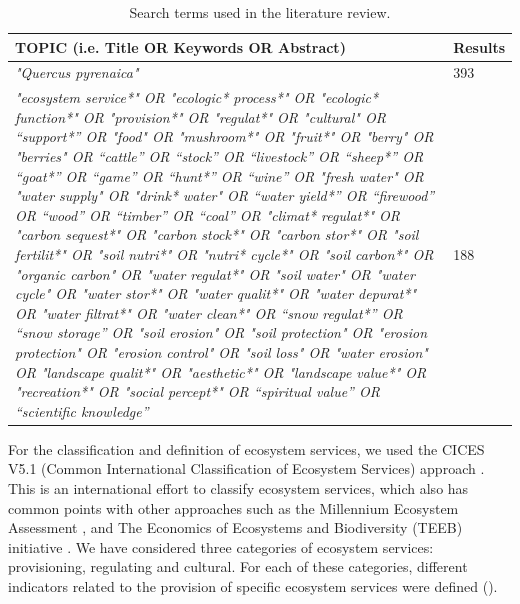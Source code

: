 \begin{table}[]
\caption{Search terms used in the literature review.}
\label{tab:es:wos}
\footnotesize
\begin{tabular}{>{\centering}p{11cm}l}
\toprule
\textbf{TOPIC (i.e. Title OR Keywords OR Abstract)} & \textbf{Results} \\ 
\toprule
\emph{"Quercus pyrenaica"} & 393 \\ \midrule
\emph{"ecosystem service*" OR "ecologic* process*" OR "ecologic*
function*" OR "provision*" OR "regulat*" OR "cultural" OR ``support*'' OR
"food" OR "mushroom*" OR "fruit*" OR "berry" OR "berries" OR
``cattle'' OR ``stock'' OR ``livestock'' OR ``sheep*'' OR ``goat*'' OR
``game'' OR ``hunt*'' OR ``wine'' OR "fresh water" OR "water supply" OR "drink* water" OR ``water
yield*'' OR ``firewood'' OR ``wood'' OR ``timber'' OR ``coal'' OR "climat* regulat*" OR "carbon sequest*" OR "carbon stock*" OR "carbon stor*" OR "soil fertilit*" OR "soil nutri*" OR "nutri* cycle*" OR "soil
carbon*" OR "organic carbon" OR "water regulat*" OR "soil water" OR "water cycle" OR "water stor*"
OR "water qualit*" OR "water depurat*" OR "water filtrat*" OR "water
clean*" OR ``snow regulat*'' OR ``snow storage'' OR "soil erosion" OR "soil protection" OR "erosion protection" OR
"erosion control" OR "soil loss" OR "water erosion" OR "landscape qualit*" OR "aesthetic*" OR "landscape value*" OR
"recreation*" OR "social percept*" OR ``spiritual value'' OR
``scientific knowledge''} & 188 \\
\bottomrule
\end{tabular}
\end{table}

For the classification and definition of ecosystem services, we used the CICES V5.1 (Common International Classification of Ecosystem Services) approach \autocites{HainesYoungPotschin2018CommonInternational}. This is an international effort to classify ecosystem services, which also has common points with other approaches such as the Millennium Ecosystem Assessment \autocite{MEA2005EcosystemsHuman}, and The Economics of Ecosystems and Biodiversity (TEEB) initiative \autocite{TEEB2010EconomicsEcosystems}. We have considered three categories of ecosystem services: provisioning, regulating and cultural. For each of these categories, different indicators related to the provision of specific ecosystem services were defined (). 

